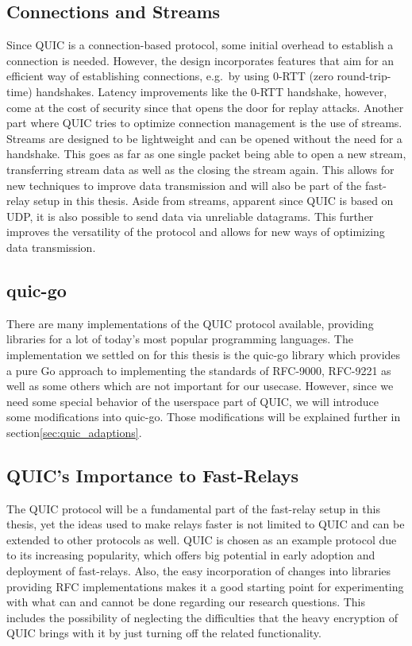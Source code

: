 \subsection{Connections and Streams}
Since QUIC is a connection-based protocol, some initial overhead to establish a connection is needed.
However, the design incorporates features that aim for an efficient way of establishing 
connections, e.g.\ by using 0-RTT (zero round-trip-time) handshakes.
Latency improvements like the 0-RTT handshake, however, come at the cost of security since that opens 
the door for replay attacks.
Another part where QUIC tries to optimize connection management is the use of streams.
Streams are designed to be lightweight and can be opened without the need for a handshake.
This goes as far as one single packet being able to open a new stream, transferring stream data
as well as the closing the stream again.
This allows for new techniques to improve data transmission and will also be part of the fast-relay 
setup in this thesis.
Aside from streams, apparent since QUIC is based on UDP, it is also possible to send data via
unreliable datagrams.
This further improves the versatility of the protocol and allows for new ways of optimizing data transmission.

\subsection{quic-go}
There are many implementations of the QUIC protocol available, providing libraries for a lot of 
today's most popular programming languages.
The implementation we settled on for this thesis is the quic-go library which provides a pure Go 
approach to implementing the standards of RFC-9000, RFC-9221 as well as some others which are not 
important for our usecase. 
However, since we need some special behavior of the userspace part of QUIC, we will introduce some 
modifications into quic-go.  
Those modifications will be explained further in section\nobreakspace\ref{sec:quic_adaptions}.

\subsection{QUIC's Importance to Fast-Relays}
The QUIC protocol will be a fundamental part of the fast-relay setup in this thesis, yet the ideas used 
to make relays faster is not limited to QUIC and can be extended to other protocols as well.
QUIC is chosen as an example protocol due to its increasing popularity, which offers big potential 
in early adoption and deployment of fast-relays.
Also, the easy incorporation of changes into libraries providing RFC implementations makes it a good 
starting point for experimenting with what can and cannot be done regarding our research questions.
This includes the possibility of neglecting the difficulties that the heavy encryption of QUIC brings with 
it by just turning off the related functionality.

